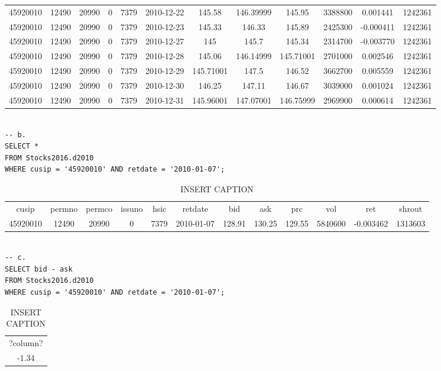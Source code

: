 \documentclass[12 pt]{article}
\begin{document}
\begin{flushleft}
\begin{table}[h]
\begin{tabular}{c c c c c c c c c c c c }
45920010 & 12490 & 20990 & 0 & 7379 & 2010-12-22 & 145.58 & 146.39999 & 145.95 & 3388800 & 0.001441 & 1242361\\
45920010 & 12490 & 20990 & 0 & 7379 & 2010-12-23 & 145.33 & 146.33 & 145.89 & 2425300 & -0.000411 & 1242361\\
45920010 & 12490 & 20990 & 0 & 7379 & 2010-12-27 & 145 & 145.7 & 145.34 & 2314700 & -0.003770 & 1242361\\
45920010 & 12490 & 20990 & 0 & 7379 & 2010-12-28 & 145.06 & 146.14999 & 145.71001 & 2701000 & 0.002546 & 1242361\\
45920010 & 12490 & 20990 & 0 & 7379 & 2010-12-29 & 145.71001 & 147.5 & 146.52 & 3662700 & 0.005559 & 1242361\\
45920010 & 12490 & 20990 & 0 & 7379 & 2010-12-30 & 146.25 & 147.11 & 146.67 & 3039000 & 0.001024 & 1242361\\
45920010 & 12490 & 20990 & 0 & 7379 & 2010-12-31 & 145.96001 & 147.07001 & 146.75999 & 2969900 & 0.000614 & 1242361\\
\end{tabular} 
 \end{table} \begin{verbatim} 

-- b.
SELECT *
FROM Stocks2016.d2010
WHERE cusip = '45920010' AND retdate = '2010-01-07'; 
 \end{verbatim} 
\begin{table}[h] 
\centering 
\caption{INSERT CAPTION} 
\label{my - label} 
\begin{tabular}{c c c c c c c c c c c c } 
\\
cusip & permno & permco & issuno & hsic & retdate & bid & ask & prc & vol & ret & shrout\\
45920010 & 12490 & 20990 & 0 & 7379 & 2010-01-07 & 128.91 & 130.25 & 129.55 & 5840600 & -0.003462 & 1313603\\
\end{tabular} 
 \end{table} \begin{verbatim} 

-- c.
SELECT bid - ask
FROM Stocks2016.d2010
WHERE cusip = '45920010' AND retdate = '2010-01-07'; 
 \end{verbatim} 
\begin{table}[h] 
\centering 
\caption{INSERT CAPTION} 
\label{my - label} 
\begin{tabular}{c } 
\\
?column?\\
-1.34\\
\end{tabular} 
 \end{table} \begin{verbatim} 


\end{verbatim}
\end{flushleft}
\end{document}
